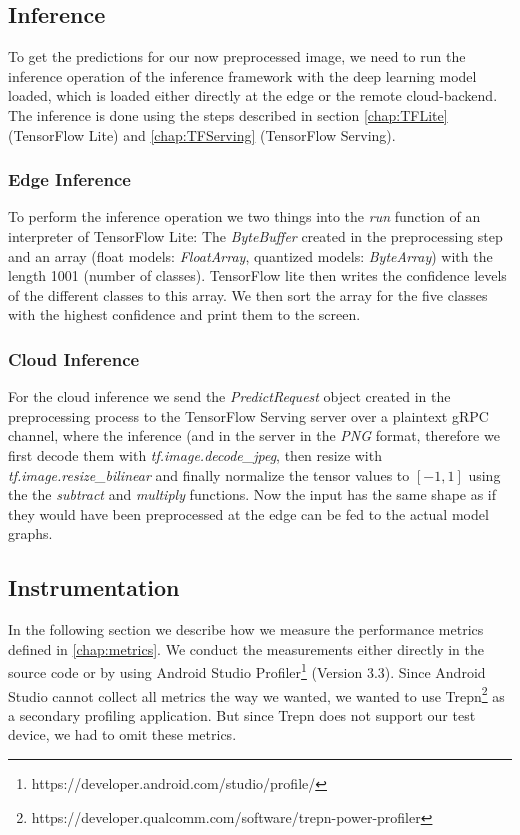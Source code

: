 

\subsection{Inference}
To get the predictions for our now preprocessed image, we need to run the inference operation of the inference framework with the deep learning model loaded, which is loaded either directly at the edge or the remote cloud-backend. 
The inference is done using the steps described in section \ref{chap:TFLite} (TensorFlow Lite) and \ref{chap:TFServing} (TensorFlow Serving).
\subsubsection{Edge Inference}
To perform the inference operation we two things into the \emph{run} function of an interpreter of TensorFlow Lite: The \emph{ByteBuffer} created in the preprocessing step and an array (float models: \emph{FloatArray}, quantized models: \emph{ByteArray}) with the length 1001 (number of classes). TensorFlow lite then writes the confidence levels of the different classes to this array. We then sort the array for the five classes with the highest confidence and print them to the screen.

\subsubsection{Cloud Inference}
\label{chap:CloudInfImpl}

For the cloud inference we send the \emph{PredictRequest} object created in the preprocessing process to the TensorFlow Serving server over a plaintext gRPC channel, where the inference (and in the server in the \emph{PNG} format, therefore we first decode them with \emph{tf.image.decode\_jpeg}, then resize with \emph{tf.image.resize\_bilinear} and finally normalize the tensor values to $[-1,1]$ using the the \emph{subtract} and \emph{multiply} functions. Now the input has the same shape as if they would have been preprocessed at the edge can be fed to the actual model graphs.

\subsection{Instrumentation}
\label{chap:insta_measurements}
In the following section we describe how we measure the performance metrics defined in \ref{chap:metrics}.
We conduct the measurements either directly in the source code or by using Android Studio Profiler\footnote{https://developer.android.com/studio/profile/} (Version 3.3). Since Android Studio cannot collect all metrics the way we wanted, we wanted to use Trepn\footnote{https://developer.qualcomm.com/software/trepn-power-profiler} as a secondary profiling application. But since Trepn does not support our test device, we had to omit these metrics.

